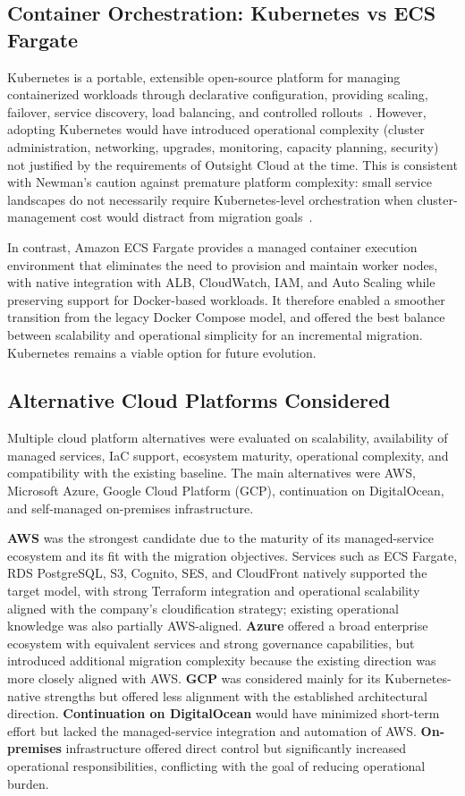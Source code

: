 \subsection{Container Orchestration: Kubernetes vs ECS Fargate}
\label{sec:k8s-ecs-comparison}
Kubernetes is a portable, extensible open-source platform for managing containerized workloads through declarative configuration, providing scaling, failover, service discovery, load balancing, and controlled rollouts~\cite{kubernetesOverview}. However, adopting Kubernetes would have introduced operational complexity (cluster administration, networking, upgrades, monitoring, capacity planning, security) not justified by the requirements of Outsight Cloud at the time. This is consistent with Newman's caution against premature platform complexity: small service landscapes do not necessarily require Kubernetes-level orchestration when cluster-management cost would distract from migration goals~\cite{newman2021building}.

In contrast, Amazon ECS Fargate provides a managed container execution environment that eliminates the need to provision and maintain worker nodes, with native integration with ALB, CloudWatch, IAM, and Auto Scaling while preserving support for Docker-based workloads. It therefore enabled a smoother transition from the legacy Docker Compose model, and offered the best balance between scalability and operational simplicity for an incremental migration. Kubernetes remains a viable option for future evolution.

\subsection{Alternative Cloud Platforms Considered}
Multiple cloud platform alternatives were evaluated on scalability, availability of managed services, IaC support, ecosystem maturity, operational complexity, and compatibility with the existing baseline. The main alternatives were AWS, Microsoft Azure, Google Cloud Platform (GCP), continuation on DigitalOcean, and self-managed on-premises infrastructure.

\textbf{AWS} was the strongest candidate due to the maturity of its managed-service ecosystem and its fit with the migration objectives. Services such as ECS Fargate, RDS PostgreSQL, S3, Cognito, SES, and CloudFront natively supported the target model, with strong Terraform integration and operational scalability aligned with the company's cloudification strategy; existing operational knowledge was also partially AWS-aligned. \textbf{Azure} offered a broad enterprise ecosystem with equivalent services and strong governance capabilities, but introduced additional migration complexity because the existing direction was more closely aligned with AWS. \textbf{GCP} was considered mainly for its Kubernetes-native strengths but offered less alignment with the established architectural direction. \textbf{Continuation on DigitalOcean} would have minimized short-term effort but lacked the managed-service integration and automation of AWS. \textbf{On-premises} infrastructure offered direct control but significantly increased operational responsibilities, conflicting with the goal of reducing operational burden.

